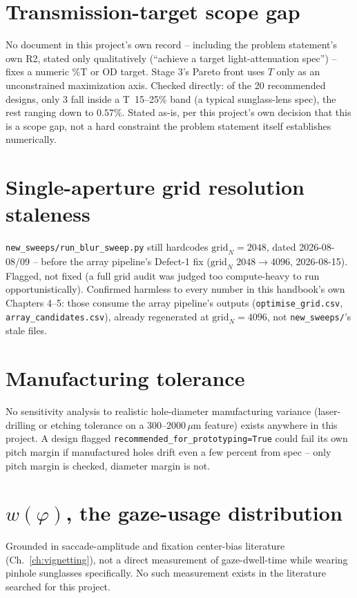 \documentclass[11pt]{report}
\begin{document}
\section{Transmission-target scope gap}
\label{sec:gap4}
No document in this project's own record -- including the problem statement's own R2, stated
only qualitatively (``achieve a target light-attenuation spec'') -- fixes a numeric \%T or OD
target. Stage 3's Pareto front uses $T$ only as an unconstrained maximization axis. Checked
directly: of the 20 recommended designs, only 3 fall inside a T~15--25\% band (a typical
sunglass-lens spec), the rest ranging down to $0.57\%$. Stated as-is, per this project's own
decision that this is a scope gap, not a hard constraint the problem statement itself
establishes numerically.

\section{Single-aperture grid resolution staleness}
\label{sec:g4}
\texttt{new\_sweeps/run\_blur\_sweep.py} still hardcodes $\text{grid}_N{=}2048$, dated
2026-08-08/09 -- before the array pipeline's Defect-1 fix ($\text{grid}_N$
$2048\to4096$, 2026-08-15). Flagged, not fixed (a full grid audit was judged too
compute-heavy to run opportunistically). Confirmed harmless to every number in this
handbook's own Chapters 4--5: those consume the array pipeline's outputs
(\texttt{optimise\_grid.csv}, \texttt{array\_candidates.csv}), already regenerated at
$\text{grid}_N{=}4096$, not \texttt{new\_sweeps/}'s stale files.

\section{Manufacturing tolerance}
No sensitivity analysis to realistic hole-diameter manufacturing variance (laser-drilling or
etching tolerance on a $300$--$2000\,\mu$m feature) exists anywhere in this project. A design
flagged \texttt{recommended\_for\_prototyping=True} could fail its own pitch margin if
manufactured holes drift even a few percent from spec -- only pitch margin is checked,
diameter margin is not.

\section{\texorpdfstring{$w(\varphi)$}{w(phi)}, the gaze-usage distribution}
Grounded in saccade-amplitude and fixation center-bias literature (Ch.~\ref{ch:vignetting}),
not a direct measurement of gaze-dwell-time while wearing pinhole sunglasses specifically. No
such measurement exists in the literature searched for this project.
\end{document}
